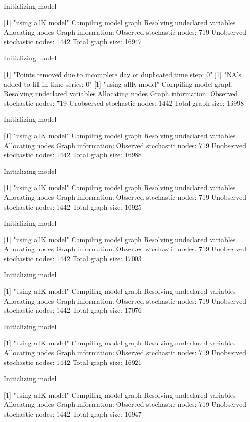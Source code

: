 \documentclass[11pt,lineno]{manuscript}\usepackage[]{graphicx}\usepackage[]{xcolor}
\begin{document}
Initializing model

[1] "using allK model"
Compiling model graph
   Resolving undeclared variables
   Allocating nodes
Graph information:
   Observed stochastic nodes: 719
   Unobserved stochastic nodes: 1442
   Total graph size: 16947

Initializing model

[1] "Points removed due to incomplete day or duplicated time step: 0"
[1] "NA's added to fill in time series: 0"
[1] "using allK model"
Compiling model graph
   Resolving undeclared variables
   Allocating nodes
Graph information:
   Observed stochastic nodes: 719
   Unobserved stochastic nodes: 1442
   Total graph size: 16998

Initializing model

[1] "using allK model"
Compiling model graph
   Resolving undeclared variables
   Allocating nodes
Graph information:
   Observed stochastic nodes: 719
   Unobserved stochastic nodes: 1442
   Total graph size: 16988

Initializing model

[1] "using allK model"
Compiling model graph
   Resolving undeclared variables
   Allocating nodes
Graph information:
   Observed stochastic nodes: 719
   Unobserved stochastic nodes: 1442
   Total graph size: 16925

Initializing model

[1] "using allK model"
Compiling model graph
   Resolving undeclared variables
   Allocating nodes
Graph information:
   Observed stochastic nodes: 719
   Unobserved stochastic nodes: 1442
   Total graph size: 17003

Initializing model

[1] "using allK model"
Compiling model graph
   Resolving undeclared variables
   Allocating nodes
Graph information:
   Observed stochastic nodes: 719
   Unobserved stochastic nodes: 1442
   Total graph size: 17076

Initializing model

[1] "using allK model"
Compiling model graph
   Resolving undeclared variables
   Allocating nodes
Graph information:
   Observed stochastic nodes: 719
   Unobserved stochastic nodes: 1442
   Total graph size: 16921

Initializing model

[1] "using allK model"
Compiling model graph
   Resolving undeclared variables
   Allocating nodes
Graph information:
   Observed stochastic nodes: 719
   Unobserved stochastic nodes: 1442
   Total graph size: 16947
\end{document}
